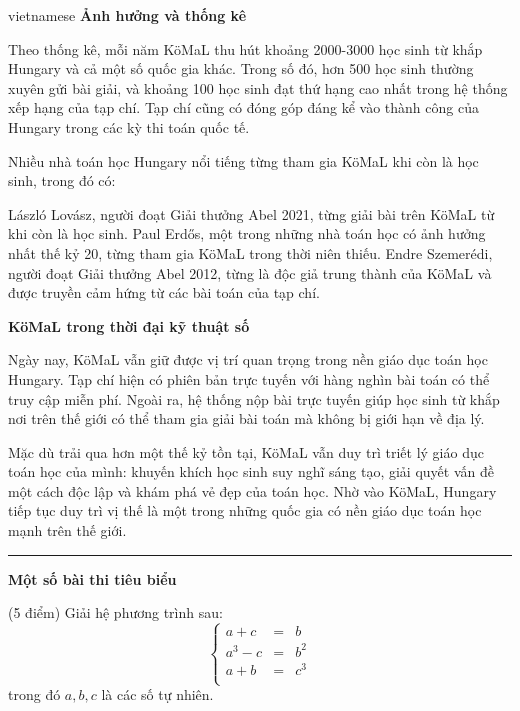 \documentclass{article}
\begin{document}
\begin{otherlanguage*}{vietnamese}
\textbf{Ảnh hưởng và thống kê}

Theo thống kê, mỗi năm KöMaL thu hút khoảng 2000-3000 học sinh từ khắp Hungary và cả một số quốc gia khác. Trong số đó, hơn 500 học sinh thường xuyên gửi bài giải,
và khoảng 100 học sinh đạt thứ hạng cao nhất trong hệ thống xếp hạng của tạp chí. Tạp chí cũng có đóng góp đáng kể vào thành công của Hungary trong các kỳ thi toán quốc tế.

Nhiều nhà toán học Hungary nổi tiếng từng tham gia KöMaL khi còn là học sinh, trong đó có:
\begin{itemize}[topsep=0pt, partopsep=0pt, itemsep=0pt]
    \ii László Lovász, người đoạt Giải thưởng Abel 2021, từng giải bài trên KöMaL từ khi còn là học sinh.
    \ii Paul Erdős, một trong những nhà toán học có ảnh hưởng nhất thế kỷ 20, từng tham gia KöMaL trong thời niên thiếu.
    \ii Endre Szemerédi, người đoạt Giải thưởng Abel 2012, từng là độc giả trung thành của KöMaL và được truyền cảm hứng từ các bài toán của tạp chí.
\end{itemize}

\textbf{KöMaL trong thời đại kỹ thuật số}

Ngày nay, KöMaL vẫn giữ được vị trí quan trọng trong nền giáo dục toán học Hungary. Tạp chí hiện có phiên bản trực tuyến với hàng nghìn bài toán có thể truy cập miễn phí.
Ngoài ra, hệ thống nộp bài trực tuyến giúp học sinh từ khắp nơi trên thế giới có thể tham gia giải bài toán mà không bị giới hạn về địa lý.

Mặc dù trải qua hơn một thế kỷ tồn tại, KöMaL vẫn duy trì triết lý giáo dục toán học của mình: khuyến khích học sinh suy nghĩ sáng tạo,
giải quyết vấn đề một cách độc lập và khám phá vẻ đẹp của toán học. Nhờ vào KöMaL, Hungary tiếp tục duy trì vị thế là một trong những quốc gia có nền giáo dục toán học mạnh trên thế giới.

\bigbreak

\noindent\rule{16.5cm}{0.4pt}

\textbf{Một số bài thi tiêu biểu}

\bigbreak

\begin{problem*}
    (5 điểm) Giải hệ phương trình sau:
    \[
        \left\{
            \begin{array}{rcl}
                a + c &=& b\\
                a^3 - c &=& b^2\\
                a + b &=& c^3\\
            \end{array}
        \right.
    \]
    trong đó \( a, b, c \) là các số tự nhiên. 
\end{problem*}


\end{otherlanguage*}
\end{document}
